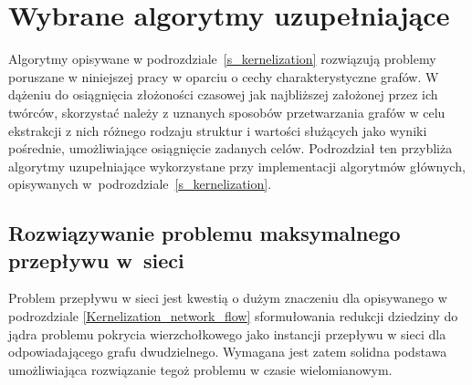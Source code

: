 \section{Wybrane algorytmy uzupełniające}\label{s_supplementary_algorithms}
\par{
  Algorytmy opisywane w podrozdziale~\ref{s_kernelization} rozwiązują problemy poruszane w niniejszej pracy w oparciu o cechy charakterystyczne grafów.
  W dążeniu do osiągnięcia złożoności czasowej jak najbliższej założonej przez ich twórców, skorzystać należy z uznanych sposobów przetwarzania grafów w celu ekstrakcji z nich różnego rodzaju struktur i wartości służących jako wyniki pośrednie, umożliwiające osiągnięcie zadanych celów.
  Podrozdział ten przybliża algorytmy uzupełniające wykorzystane przy implementacji algorytmów głównych, opisywanych w~podrozdziale~\ref{s_kernelization}.
}

\subsection{Rozwiązywanie problemu maksymalnego przepływu w~sieci}\label{ss_max_flow}
\par{
  Problem przepływu w sieci jest kwestią o dużym znaczeniu dla opisywanego w podrozdziale \ref{Kernelization_network_flow} sformułowania redukcji dziedziny do jądra problemu pokrycia wierzchołkowego jako instancji przepływu w sieci dla odpowiadającego grafu dwudzielnego. 
  Wymagana jest zatem solidna podstawa umożliwiająca rozwiązanie tegoż problemu w czasie wielomianowym.
}
